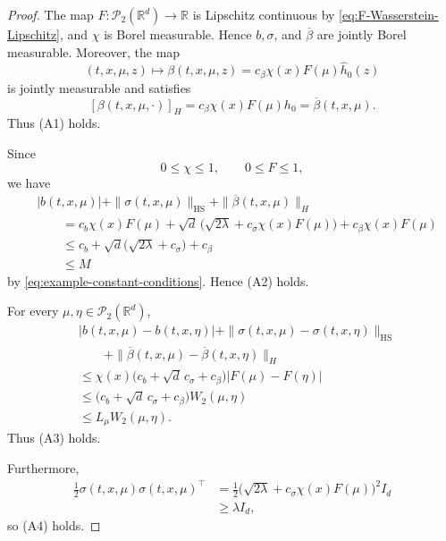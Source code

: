 \documentclass[12pt,oneside, reqno]{amsart}
\numberwithin{equation}{section}
\begin{document}
	\begin{proof}
		The map $F:\mathcal P_2(\mathbb R^d)\to\mathbb R$ is Lipschitz
		continuous by \eqref{eq:F-Wasserstein-Lipschitz}, and $\chi$ is
		Borel measurable. Hence $b,\sigma$, and $\overline\beta$ are
		jointly Borel measurable. Moreover, the map
		\[
		(t,x,\mu,z)
		\longmapsto
		\beta(t,x,\mu,z)
		=
		c_\beta\chi(x)F(\mu)\widehat h_0(z)
		\]
		is jointly measurable and satisfies
		\[
		[\beta(t,x,\mu,\cdot)]_H
		=
		c_\beta\chi(x)F(\mu)h_0
		=
		\overline\beta(t,x,\mu).
		\]
		Thus \textnormal{(A1)} holds.
		
		Since
		\[
		0\leq\chi\leq1,
		\qquad
		0\leq F\leq1,
		\]
		we have
		\[
		\begin{aligned}
			&|b(t,x,\mu)|
			+
			\|\sigma(t,x,\mu)\|_{\mathrm{HS}}
			+
			\|\overline\beta(t,x,\mu)\|_H
			\\
			&\qquad=
			c_b\chi(x)F(\mu)
			+
			\sqrt d\,
			\bigl(
			\sqrt{2\lambda}
			+c_\sigma\chi(x)F(\mu)
			\bigr)
			+
			c_\beta\chi(x)F(\mu)
			\\
			&\qquad\leq
			c_b
			+
			\sqrt d\bigl(\sqrt{2\lambda}+c_\sigma\bigr)
			+
			c_\beta
			\\
			&\qquad\leq M
		\end{aligned}
		\]
		by \eqref{eq:example-constant-conditions}. Hence
		\textnormal{(A2)} holds.
		
		For every $\mu,\eta\in\mathcal P_2(\mathbb R^d)$,
		\[
		\begin{aligned}
			&|b(t,x,\mu)-b(t,x,\eta)|
			+
			\|\sigma(t,x,\mu)-\sigma(t,x,\eta)\|_{\mathrm{HS}}
			\\
			&\qquad+
			\|\overline\beta(t,x,\mu)
			-\overline\beta(t,x,\eta)\|_H
			\\
			&\leq
			\chi(x)
			\bigl(
			c_b+\sqrt d\,c_\sigma+c_\beta
			\bigr)
			|F(\mu)-F(\eta)|
			\\
			&\leq
			\bigl(
			c_b+\sqrt d\,c_\sigma+c_\beta
			\bigr)
			W_2(\mu,\eta)
			\\
			&\leq
			L_\mu W_2(\mu,\eta).
		\end{aligned}
		\]
		Thus \textnormal{(A3)} holds.
		
		Furthermore,
		\[
		\begin{aligned}
			\frac12
			\sigma(t,x,\mu)\sigma(t,x,\mu)^\top
			&=
			\frac12
			\bigl(
			\sqrt{2\lambda}
			+c_\sigma\chi(x)F(\mu)
			\bigr)^2I_d
			\\
			&\geq
			\lambda I_d,
		\end{aligned}
		\]
		so \textnormal{(A4)} holds.
		

\end{proof}
\end{document}
